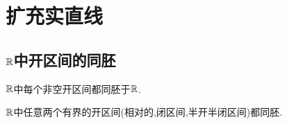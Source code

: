 \chapter{扩充实直线}

\section{\texorpdfstring{$\mathbb{R}$}{R}中开区间的同胚}

\begin{proposition}{}{}
	$\mathbb{R}$中每个非空开区间都同胚于$\mathbb{R}$.
\end{proposition}

\begin{remark}{}{}
	$\mathbb{R}$中任意两个有界的开区间(相对的,闭区间,半开半闭区间)都同胚.
\end{remark}

